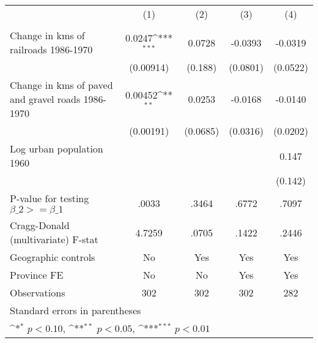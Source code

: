 {
\def\sym#1{\ifmmode^{#1}\else\(^{#1}\)\fi}
\begin{tabular}{l*{4}{c}}
\hline\hline
                &\multicolumn{1}{c}{(1)}&\multicolumn{1}{c}{(2)}&\multicolumn{1}{c}{(3)}&\multicolumn{1}{c}{(4)}\\
                &\multicolumn{1}{c}{}&\multicolumn{1}{c}{}&\multicolumn{1}{c}{}&\multicolumn{1}{c}{}\\
\hline
Change in kms of railroads 1986-1970&   0.0247\sym{***}&   0.0728         &  -0.0393         &  -0.0319         \\
                &(0.00914)         &  (0.188)         & (0.0801)         & (0.0522)         \\
[1em]
Change in kms of paved and gravel roads 1986-1970&  0.00452\sym{**} &   0.0253         &  -0.0168         &  -0.0140         \\
                &(0.00191)         & (0.0685)         & (0.0316)         & (0.0202)         \\
[1em]
Log urban population 1960&                  &                  &                  &    0.147         \\
                &                  &                  &                  &  (0.142)         \\
\hline
P-value for testing $\beta\_{2} >= \beta\_{1}$&    .0033         &    .3464         &    .6772         &    .7097         \\
Cragg-Donald (multivariate) F-stat&   4.7259         &    .0705         &    .1422         &    .2446         \\
Geographic controls&       No         &      Yes         &      Yes         &      Yes         \\
Province FE     &       No         &       No         &      Yes         &      Yes         \\
Observations    &      302         &      302         &      302         &      282         \\
\hline\hline
\multicolumn{5}{l}{\footnotesize Standard errors in parentheses}\\
\multicolumn{5}{l}{\footnotesize \sym{*} \(p<0.10\), \sym{**} \(p<0.05\), \sym{***} \(p<0.01\)}\\
\end{tabular}
}
